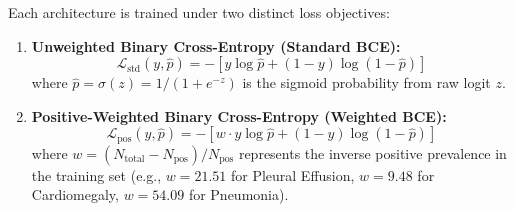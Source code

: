 \documentclass[preprint,12pt]{elsarticle}
\begin{document}
Each architecture is trained under two distinct loss objectives:
\begin{enumerate}
    \item \textbf{Unweighted Binary Cross-Entropy (Standard BCE):}
    \begin{equation}
    \mathcal{L}_{\text{std}}(y, \hat{p}) = - [y \log \hat{p} + (1 - y) \log(1 - \hat{p})]
    \end{equation}
    where $\hat{p} = \sigma(z) = 1 / (1 + e^{-z})$ is the sigmoid probability from raw logit $z$.
    \item \textbf{Positive-Weighted Binary Cross-Entropy (Weighted BCE):}
    \begin{equation}
    \mathcal{L}_{\text{pos}}(y, \hat{p}) = - [w \cdot y \log \hat{p} + (1 - y) \log(1 - \hat{p})]
    \end{equation}
    where $w = (N_{\text{total}} - N_{\text{pos}}) / N_{\text{pos}}$ represents the inverse positive prevalence in the training set (e.g., $w = 21.51$ for Pleural Effusion, $w = 9.48$ for Cardiomegaly, $w = 54.09$ for Pneumonia).
\end{enumerate}
\end{document}
